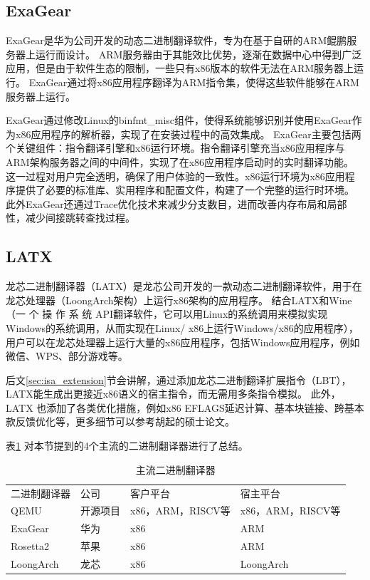 \subsection{ExaGear}

ExaGear是华为公司开发的动态二进制翻译软件，专为在基于自研的ARM鲲鹏服务器上运行而设计。
ARM服务器由于其能效比优势，逐渐在数据中心中得到广泛应用，但是由于软件生态的限制，一些只有x86版本的软件无法在ARM服务器上运行。
ExaGear通过将x86应用程序翻译为ARM指令集，使得这些软件能够在ARM服务器上运行。

ExaGear通过修改Linux的binfmt\_misc组件，使得系统能够识别并使用ExaGear作为x86应用程序的解析器，实现了在安装过程中的高效集成。
ExaGear主要包括两个关键组件：指令翻译引擎和x86运行环境。指令翻译引擎充当x86应用程序与ARM架构服务器之间的中间件，实现了在x86应用程序启动时的实时翻译功能。
这一过程对用户完全透明，确保了用户体验的一致性。x86运行环境为x86应用程序提供了必要的标准库、实用程序和配置文件，构建了一个完整的运行时环境。
此外ExaGear还通过Trace优化技术来减少分支数目，进而改善内存布局和局部性，减少间接跳转查找过程\cite{LvYandong2021}。

\subsection{LATX}

龙芯二进制翻译器（LATX）是龙芯公司开发的一款动态二进制翻译软件，用于在龙芯处理器（LoongArch架构）上运行x86架构的应用程序。
结合LATX和Wine\cite{amstadt1994wine}（一 个 操 作 系 统 API翻译软件，它可以用Linux的系统调用来模拟实现Windows的系统调用，从而实现在Linux/ x86上运行Windows/x86的应用程序），
用户可以在龙芯处理器上运行大量的x86应用程序，包括Windows应用程序，例如微信、WPS、部分游戏等。

后文\ref{sec:isa_extension}节会讲解，通过添加龙芯二进制翻译扩展指令（LBT），LATX能生成出更接近x86语义的宿主指令，而无需用多条指令模拟。
此外，LATX 也添加了各类优化措施，例如x86 EFLAGS延迟计算、基本块链接、跨基本款反馈优化等，更多细节可以参考胡起的硕士论文\cite{HuQi2023}。

表\ref{tab:BTs} 对本节提到的4个主流的二进制翻译器进行了总结。

\begin{table}[!htbp]
  \centering
  \caption{主流二进制翻译器}
  \label{tab:BTs}
    \begin{tabular}{llll}
    \rowcolor[HTML]{FBE5D6} 
    二进制翻译器    & 公司   & 客户平台           & 宿主平台           \\
    QEMU      & 开源项目 & x86，ARM，RISCV等 & x86，ARM，RISCV等  \\
    ExaGear   & 华为   & x86            & ARM            \\
    Rosetta2  & 苹果   & x86            & ARM            \\
    LoongArch & 龙芯   & x86            & LoongArch      
    \end{tabular}
    \end{table}

